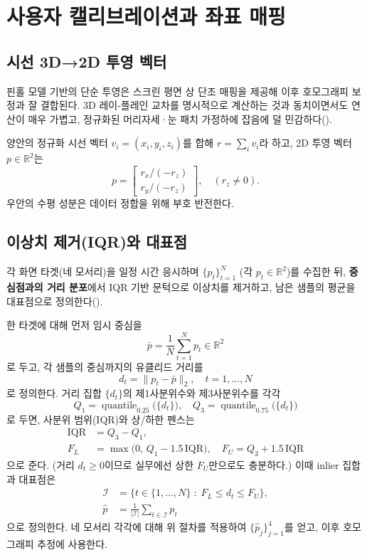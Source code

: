 \documentclass[10pt,a4paper]{article}
\begin{document}
\section{사용자 캘리브레이션과 좌표 매핑}
\subsection{시선 3D→2D 투영 벡터}
핀홀 모델 기반의 단순 투영은 스크린 평면 상 단조 매핑을 제공해 이후 호모그래피 보정과 잘 결합된다. 3D 레이-플레인 교차를 명시적으로 계산하는 것과 동치이면서도 연산이 매우 가볍고, 정규화된 머리자세·눈 패치 가정하에 잡음에 덜 민감하다(\cite{HartleyZisserman2004}).

양안의 정규화 시선 벡터 $v_i=(x_i,y_i,z_i)$를 합해 $r=\sum_i v_i$라 하고, 2D 투영 벡터 $p\in\mathbb{R}^2$는
\begin{equation}
  p = \begin{bmatrix} r_x/(-r_z) \\ r_y/(-r_z) \end{bmatrix},\quad (r_z\neq 0).
\end{equation}
우안의 수평 성분은 데이터 정합을 위해 부호 반전한다.


\subsection{이상치 제거(IQR)와 대표점}
각 화면 타겟(네 모서리)을 일정 시간 응시하며 $\{p_t\}_{t=1}^N$ (각 $p_t\in\mathbb{R}^2$)를 수집한 뒤, \textbf{중심점과의 거리 분포}에서 IQR 기반 문턱으로 이상치를 제거하고, 남은 샘플의 평균을 대표점으로 정의한다(\cite{Tukey1977EDA}).

한 타겟에 대해 먼저 임시 중심을
\begin{equation}
  \bar{p} = \frac{1}{N}\sum_{t=1}^N p_t \in \mathbb{R}^2
\end{equation}
로 두고, 각 샘플의 중심까지의 유클리드 거리를
\begin{equation}
  d_t = \lVert p_t - \bar{p} \rVert_2,\quad t=1,\dots,N
\end{equation}
로 정의한다. 거리 집합 $\{d_t\}$의 제1사분위수와 제3사분위수를 각각
\begin{equation}
  Q_1 = \operatorname{quantile}_{0.25}\big(\{d_t\}\big),\quad
  Q_3 = \operatorname{quantile}_{0.75}\big(\{d_t\}\big)
\end{equation}
로 두면, 사분위 범위(IQR)와 상/하한 펜스는
\begin{align}
  \mathrm{IQR} &= Q_3 - Q_1,\\
  F_L &= \max\big(0,\, Q_1 - 1.5\,\mathrm{IQR}\big),\quad
  F_U = Q_3 + 1.5\,\mathrm{IQR}
\end{align}
으로 준다. (거리 $d_t\ge 0$이므로 실무에선 상한 $F_U$만으로도 충분하다.)
이때 inlier 집합과 대표점은
\begin{align}
  \mathcal{I} &= \big\{ t\in\{1,\dots,N\}\;:\; F_L \le d_t \le F_U \big\},\\
  \hat{p} &= \frac{1}{|\mathcal{I}|}\sum_{t\in\mathcal{I}} p_t
\end{align}
으로 정의한다. 네 모서리 각각에 대해 위 절차를 적용하여 $\{\hat{p}_j\}_{j=1}^4$를 얻고, 이후 호모그래피 추정에 사용한다.
\end{document}
